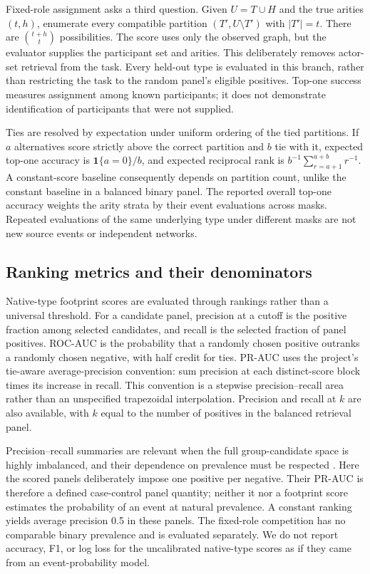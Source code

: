 \documentclass[10pt]{article}
\newcommand{\ind}{\mathbf{1}}
\begin{document}
Fixed-role assignment asks a third question. Given $U=T\cup H$ and the true arities $(t,h)$, enumerate every compatible partition $(T',U\setminus T')$ with $|T'|=t$. There are $\binom{t+h}{t}$ possibilities. The score uses only the observed graph, but the evaluator supplies the participant set and arities. This deliberately removes actor-set retrieval from the task. Every held-out type is evaluated in this branch, rather than restricting the task to the random panel's eligible positives. Top-one success measures assignment among known participants; it does not demonstrate identification of participants that were not supplied.

Ties are resolved by expectation under uniform ordering of the tied partitions. If $a$ alternatives score strictly above the correct partition and $b$ tie with it, expected top-one accuracy is $\ind\{a=0\}/b$, and expected reciprocal rank is $b^{-1}\sum_{r=a+1}^{a+b}r^{-1}$. A constant-score baseline consequently depends on partition count, unlike the constant baseline in a balanced binary panel. The reported overall top-one accuracy weights the arity strata by their event evaluations across masks. Repeated evaluations of the same underlying type under different masks are not new source events or independent networks.

\subsection{Ranking metrics and their denominators}
Native-type footprint scores are evaluated through rankings rather than a universal threshold. For a candidate panel, precision at a cutoff is the positive fraction among selected candidates, and recall is the selected fraction of panel positives. ROC-AUC is the probability that a randomly chosen positive outranks a randomly chosen negative, with half credit for ties. PR-AUC uses the project's tie-aware average-precision convention: sum precision at each distinct-score block times its increase in recall. This convention is a stepwise precision--recall area rather than an unspecified trapezoidal interpolation. Precision and recall at $k$ are also available, with $k$ equal to the number of positives in the balanced retrieval panel.

Precision--recall summaries are relevant when the full group-candidate space is highly imbalanced, and their dependence on prevalence must be respected \citep{saitoRehmsmeier2015}. Here the scored panels deliberately impose one positive per negative. Their PR-AUC is therefore a defined case-control panel quantity; neither it nor a footprint score estimates the probability of an event at natural prevalence. A constant ranking yields average precision 0.5 in these panels. The fixed-role competition has no comparable binary prevalence and is evaluated separately. We do not report accuracy, F1, or log loss for the uncalibrated native-type scores as if they came from an event-probability model.
\end{document}

